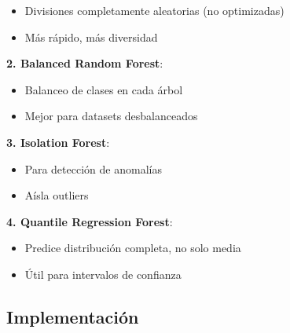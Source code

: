 \documentclass[
  doc,
  floatsintext,
  longtable,
  a4paper,
  nolmodern,
  notxfonts,
  notimes,
  12pt,
  colorlinks=true,linkcolor=blue,citecolor=blue,urlcolor=blue]{apa7}
\providecommand{\tightlist}{%
  \setlength{\itemsep}{0pt}\setlength{\parskip}{0pt}}
\begin{document}
\begin{itemize}
\tightlist
\item
  Divisiones completamente aleatorias (no optimizadas)
\item
  Más rápido, más diversidad
\end{itemize}

\textbf{2. Balanced Random Forest}:

\begin{itemize}
\tightlist
\item
  Balanceo de clases en cada árbol
\item
  Mejor para datasets desbalanceados
\end{itemize}

\textbf{3. Isolation Forest}:

\begin{itemize}
\tightlist
\item
  Para detección de anomalías
\item
  Aísla outliers
\end{itemize}

\textbf{4. Quantile Regression Forest}:

\begin{itemize}
\tightlist
\item
  Predice distribución completa, no solo media
\item
  Útil para intervalos de confianza
\end{itemize}

\subsection{Implementación}\label{implementaciuxf3n-2}
\end{document}
